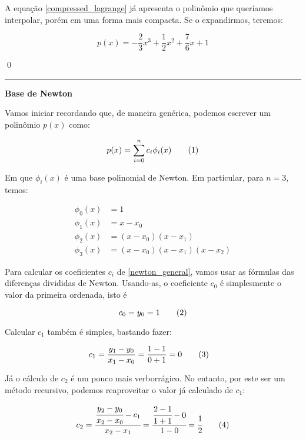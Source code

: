 \documentclass[9.5pt,reqno,a4paper]{amsart}
\newcommand\numberthis{\addtocounter{equation}{1}\tag{\theequation}}
\begin{document}
\bigskip
\bigskip
A equação \eqref{compressed_lagrange} já apresenta o polinômio que queríamos interpolar, porém em uma forma mais compacta. Se o expandirmos, teremos:

\begin{equation}
    p(x) = -\frac{2}{3}x^3 + \frac{1}{2}x^2  + \frac{7}{6}x + 1
\end{equation}

\qed\null

\bigskip
\bigskip
\noindent\rule{\textwidth}{0.4pt}
\textbf{Base de Newton}

Vamos iniciar recordando que, de maneira genérica, podemos escrever um polinômio $p(x)$ como:

\begin{equation*}
    p(x) = \sum_{i=0}^{n} c_i\phi_i(x) \numberthis \label{newton_general}
\end{equation*}

\bigskip
\bigskip
Em que $\phi_i(x)$ é uma base polinomial de Newton. Em particular, para $n=3$, temos:

\begin{align*}
    \phi_0(x) &= 1\\
    \phi_1(x) &= x - x_0\\
    \phi_2(x) &= (x - x_0)(x - x_1)\\
    \phi_3(x) &= (x - x_0)(x - x_1)(x - x_2)
\end{align*}

\bigskip
\bigskip
Para calcular os coeficientes $c_i$ de \eqref{newton_general}, vamos usar as fórmulas das diferenças divididas de Newton. Usando-as, o coeficiente $c_0$ é simplesmente o valor da primeira ordenada, isto é

\begin{equation*}
    c_0 = y_0 = 1 \numberthis \label{c_0}
\end{equation*}

\bigskip
\bigskip
Calcular $c_1$ também é simples, bastando fazer:

\begin{align*}
    c_1 &= \frac{y_1 - y_0}{x_1 - x_0} = \frac{1 - 1}{0 + 1} = 0 \numberthis \label{c_1}
\end{align*}

\bigskip
\bigskip
Já o cálculo de $c_2$ é um pouco mais verborrágico. No entanto, por este ser um método recursivo, podemos reaproveitar o valor já calculado de $c_1$:

\begin{align*}
    c_2 = \cfrac{\cfrac{y_2 - y_0}{x_2 - x_0} - c_1}{x_2 - x_1}
        = \cfrac{\cfrac{2 - 1}{1 + 1} - 0}{1 - 0}
        = \cfrac{1}{2} \numberthis \label{c_2}
\end{align*}
\end{document}
